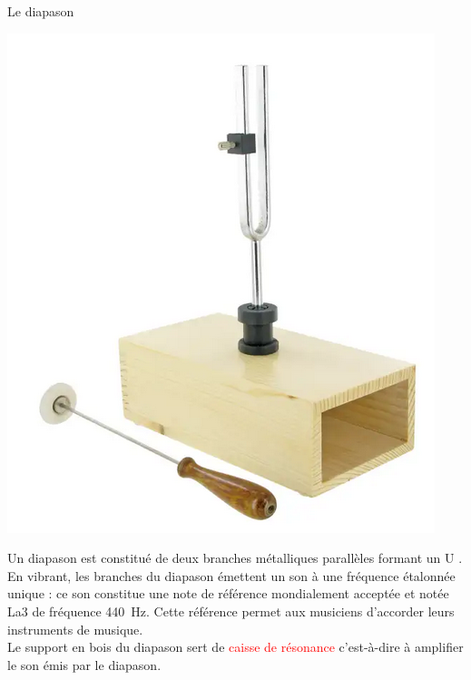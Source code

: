 \begin{doc}{Le diapason}
\begin{center}
\vspace{-0.5cm}
     \includegraphics[scale=0.5]{Images/TP/TP8/Diapason.PNG}
\end{center}
Un diapason est constitué de deux branches métalliques parallèles formant un \og U \fg. En vibrant, les branches du diapason émettent un son à une fréquence étalonnée unique : ce son constitue une note de référence mondialement acceptée et notée La3 de fréquence 440~Hz. Cette référence permet aux musiciens d'accorder leurs instruments de musique.\\
Le support en bois du diapason sert de \textcolor{red}{caisse de résonance} c'est-à-dire à amplifier le son émis par le diapason.
\end{doc}

